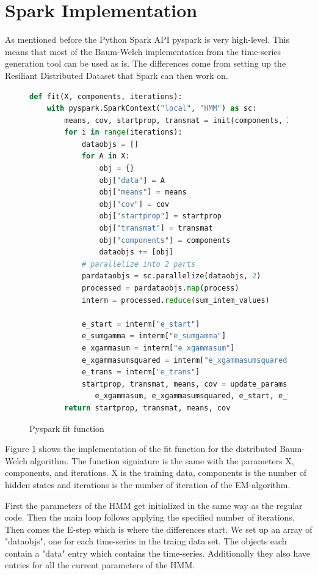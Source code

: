 \section{Spark Implementation}

As mentioned before the Python Spark API pyspark is very high-level. This means that most of the Baum-Welch implementation from the time-series generation tool can be used as is. The differences come from setting up the Resiliant Distributed Dataset that Spark can then work on. 

\begin{figure}
\begin{singlespace}
\begin{lstlisting}[language=Python]
def fit(X, components, iterations):
    with pyspark.SparkContext("local", "HMM") as sc:
        means, cov, startprop, transmat = init(components, X)
        for i in range(iterations):
            dataobjs = []
            for A in X:
                obj = {}
                obj["data"] = A
                obj["means"] = means
                obj["cov"] = cov
                obj["startprop"] = startprop
                obj["transmat"] = transmat
                obj["components"] = components
                dataobjs += [obj]
            # parallelize into 2 parts
            pardataobjs = sc.parallelize(dataobjs, 2)
            processed = pardataobjs.map(process)
            interm = processed.reduce(sum_intem_values)

            e_start = interm["e_start"]
            e_sumgamma = interm["e_sumgamma"]
            e_xgammasum = interm["e_xgammasum"]
            e_xgammasumsquared = interm["e_xgammasumsquared"]
            e_trans = interm["e_trans"]
            startprop, transmat, means, cov = update_params(e_sumgamma, \
               e_xgammasum, e_xgammasumsquared, e_start, e_trans)
        return startprop, transmat, means, cov
\end{lstlisting}
\end{singlespace}
\caption{Pyspark fit function}    
\label{fig:pyspark-fit-listing}
\end{figure}

Figure \ref{fig:pyspark-fit-listing} shows the implementation of the fit function for the distributed Baum-Welch algorithm. The function signiature is the same with the parameters X, components, and iterations. X is the training data, components is the number of hidden states and iterations is the number of iteration of the EM-algorithm. 

First the parameters of the HMM get initialized in the same way as the regular code. Then the main loop follows applying the specified number of iterations. Then comes the E-step which is where the differences start. We set up an array of "dataobjs", one for each time-series in the traing data set. The objects each contain a "data" entry which contains the time-series. Additionally they also have entries for all the current parameters of the HMM. 

